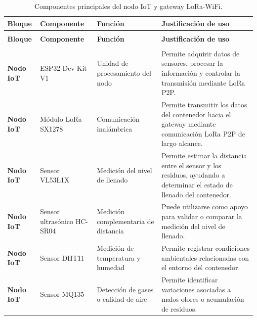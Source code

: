 \begin{xltabular}{\linewidth}{
>{\raggedright\arraybackslash}p{2.4cm}
>{\raggedright\arraybackslash}p{3.2cm}
>{\raggedright\arraybackslash}p{3.6cm}
>{\raggedright\arraybackslash}X}
\caption{Componentes principales del nodo IoT y gateway LoRa-WiFi.}
\label{tab:componentes_nodo_gateway} \\
\toprule
\textbf{Bloque} & \textbf{Componente} & \textbf{Función} & \textbf{Justificación de uso} \\
\midrule
\endfirsthead

 \\
\toprule
\textbf{Bloque} & \textbf{Componente} & \textbf{Función} & \textbf{Justificación de uso} \\
\midrule
\endhead

\midrule
{} \\
\endfoot

\bottomrule
\endlastfoot

\textbf{Nodo IoT} 
& ESP32 Dev Kit V1 
& Unidad de procesamiento del nodo 
& Permite adquirir datos de sensores, procesar la información y controlar la transmisión mediante LoRa P2P. \\

\textbf{Nodo IoT} 
& Módulo LoRa SX1278 
& Comunicación inalámbrica 
& Permite transmitir los datos del contenedor hacia el gateway mediante comunicación LoRa P2P de largo alcance. \\

\textbf{Nodo IoT} 
& Sensor VL53L1X 
& Medición del nivel de llenado 
& Permite estimar la distancia entre el sensor y los residuos, ayudando a determinar el estado de llenado del contenedor. \\

\textbf{Nodo IoT} 
& Sensor ultrasónico HC-SR04 
& Medición complementaria de distancia 
& Puede utilizarse como apoyo para validar o comparar la medición del nivel de llenado. \\

\textbf{Nodo IoT} 
& Sensor DHT11 
& Medición de temperatura y humedad 
& Permite registrar condiciones ambientales relacionadas con el entorno del contenedor. \\

\textbf{Nodo IoT} 
& Sensor MQ135 
& Detección de gases o calidad de aire 
& Permite identificar variaciones asociadas a malos olores o acumulación de residuos. \\


\end{xltabular}
